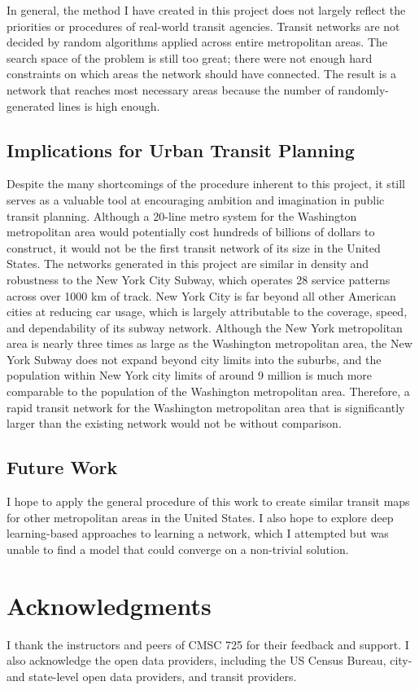 \documentclass[manuscript,nonacm]{acmart}
\begin{document}
In general, the method I have created in this project does not largely reflect the priorities or procedures of real-world transit agencies. Transit networks are not decided by random algorithms applied across entire metropolitan areas. The search space of the problem is still too great; there were not enough hard constraints on which areas the network should have connected. The result is a network that reaches most necessary areas because the number of randomly-generated lines is high enough. 

\subsection{Implications for Urban Transit Planning}
Despite the many shortcomings of the procedure inherent to this project, it still serves as a valuable tool at encouraging ambition and imagination in public transit planning. Although a 20-line metro system for the Washington metropolitan area would potentially cost hundreds of billions of dollars to construct, it would not be the first transit network of its size in the United States. The networks generated in this project are similar in density and robustness to the New York City Subway, which operates 28 service patterns across over 1000 km of track. New York City is far beyond all other American cities at reducing car usage, which is largely attributable to the coverage, speed, and dependability of its subway network. Although the New York metropolitan area is nearly three times as large as the Washington metropolitan area, the New York Subway does not expand beyond city limits into the suburbs, and the population within New York city limits of around 9 million is much more comparable to the population of the Washington metropolitan area. Therefore, a rapid transit network for the Washington metropolitan area that is significantly larger than the existing network would not be without comparison. 

\subsection{Future Work}

I hope to apply the general procedure of this work to create similar transit maps for other metropolitan areas in the United States. I also hope to explore deep learning-based approaches to learning a network, which I attempted but was unable to find a model that could converge on a non-trivial solution. 

\section{Acknowledgments}

I thank the instructors and peers of CMSC 725 for their feedback and support. I also acknowledge the open data providers, including the US Census Bureau, city- and state-level open data providers, and transit providers.



\end{document}
